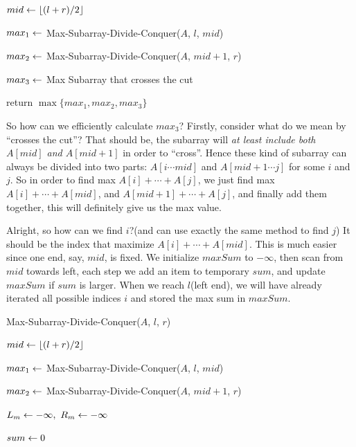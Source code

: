 \documentclass[11pt, a4paper]{COMP3711}
\begin{document}
\begin{spacing}{1.5}
\begin{algorithm}
        $mid\leftarrow \lfloor (l+r)/2 \rfloor$

        $max_1\leftarrow $ Max-Subarray-Divide-Conquer($A$, $l$, $mid$)

        $max_2\leftarrow $ Max-Subarray-Divide-Conquer($A$, $mid+1$, $r$)

        $max_3\leftarrow $ Max Subarray that crosses the cut

        return $\max \{ max_1, max_2, max_3 \}$
    \end{algorithm}

    So how can we efficiently calculate $max_3$? Firstly, consider 
    what do we mean by ``crosses the cut''? That should be, 
    the subarray will {\it at least include both $A[mid]$ and $A[mid+1]$}
    in order to ``cross''. Hence these kind of subarray can always be 
    divided into two parts: $A[i\cdots mid]$ and $A[mid+1\cdots j]$
    for some $i$ and $j$. So in order to find max $A[i]+\cdots +A[j]$,
    we just find max $A[i]+\cdots +A[mid]$, and $A[mid+1]+\cdots +A[j]$,
    and finally add them together, this will definitely give us 
    the max value.

    Alright, so how can we find $i$?(and can use exactly the same 
    method to find $j$)
    It should be the index that maximize $A[i]+\cdots +A[mid]$.
    This is much easier since one end, say, $mid$, is fixed.
    We initialize $maxSum$ to $-\infty$, then scan from $mid$ towards left,
    each step we add an item to temporary $sum$, and update 
    $maxSum$ if $sum$ is larger. When we reach $l$(left end), 
    we will have already iterated all possible indices $i$ and 
    stored the max sum in $maxSum$.
    
    \begin{algorithm}
        \caption{Max-Subarray-Divide-Conquer($A$, $l$, $r$)}


        $mid\leftarrow \lfloor (l+r)/2 \rfloor$

        $max_1\leftarrow $ Max-Subarray-Divide-Conquer($A$, $l$, $mid$)

        $max_2\leftarrow $ Max-Subarray-Divide-Conquer($A$, $mid+1$, $r$)


        $L_m\leftarrow -\infty,\ R_m\leftarrow -\infty$

        $sum\leftarrow 0$



\end{algorithm}
\end{spacing}
\end{document}
